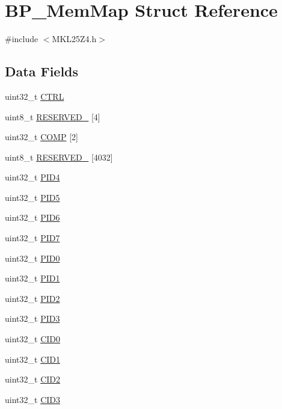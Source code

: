 \hypertarget{struct_b_p___mem_map}{}\section{B\+P\+\_\+\+Mem\+Map Struct Reference}
\label{struct_b_p___mem_map}


{\ttfamily \#include $<$M\+K\+L25\+Z4.\+h$>$}

\subsection*{Data Fields}
\begin{DoxyCompactItemize}
\item 
uint32\+\_\+t \hyperlink{struct_b_p___mem_map_a3be6514ca3bd369fd0de9f8f49471179}{C\+T\+RL}
\item 
uint8\+\_\+t \hyperlink{struct_b_p___mem_map_a71277aaa40be4473ac2521981f273bd3}{R\+E\+S\+E\+R\+V\+E\+D\+\_} \mbox{[}4\mbox{]}
\item 
uint32\+\_\+t \hyperlink{struct_b_p___mem_map_afb7d1b290d30b9254c6975be8cfafbd7}{C\+O\+MP} \mbox{[}2\mbox{]}
\item 
uint8\+\_\+t \hyperlink{struct_b_p___mem_map_ac9276921ef84716eb43e5be528cf04e3}{R\+E\+S\+E\+R\+V\+E\+D\+\_} \mbox{[}4032\mbox{]}
\item 
uint32\+\_\+t \hyperlink{struct_b_p___mem_map_a4b742da36aa92236a876883d225769d9}{P\+I\+D4}
\item 
uint32\+\_\+t \hyperlink{struct_b_p___mem_map_a89a2228208ede3f7821c62acc24817e7}{P\+I\+D5}
\item 
uint32\+\_\+t \hyperlink{struct_b_p___mem_map_afbf6d9cf2860db9747fe2490f0a52bc9}{P\+I\+D6}
\item 
uint32\+\_\+t \hyperlink{struct_b_p___mem_map_a1658a67c3a52064ae611268d27ed5159}{P\+I\+D7}
\item 
uint32\+\_\+t \hyperlink{struct_b_p___mem_map_a769a58cfc13da35629a0e87f06abf754}{P\+I\+D0}
\item 
uint32\+\_\+t \hyperlink{struct_b_p___mem_map_a6e66209ba976b8d677c86ee05f0ee2fa}{P\+I\+D1}
\item 
uint32\+\_\+t \hyperlink{struct_b_p___mem_map_a8c56863ae2fd45dbee06b0ba0c7c17c7}{P\+I\+D2}
\item 
uint32\+\_\+t \hyperlink{struct_b_p___mem_map_acf224ed0d83cc1ae7b8492c6cd79e5dd}{P\+I\+D3}
\item 
uint32\+\_\+t \hyperlink{struct_b_p___mem_map_a46667149a1f5fa643ce1b5e7d55d85fb}{C\+I\+D0}
\item 
uint32\+\_\+t \hyperlink{struct_b_p___mem_map_afafacc56ceb45f360e2f940ee6b00467}{C\+I\+D1}
\item 
uint32\+\_\+t \hyperlink{struct_b_p___mem_map_a3451ba8427632b30ce7bbaf9e9aa37a4}{C\+I\+D2}
\item 
uint32\+\_\+t \hyperlink{struct_b_p___mem_map_aea4c61492fd7567bc47e9a5eaf95ca58}{C\+I\+D3}
\end{DoxyCompactItemize}


